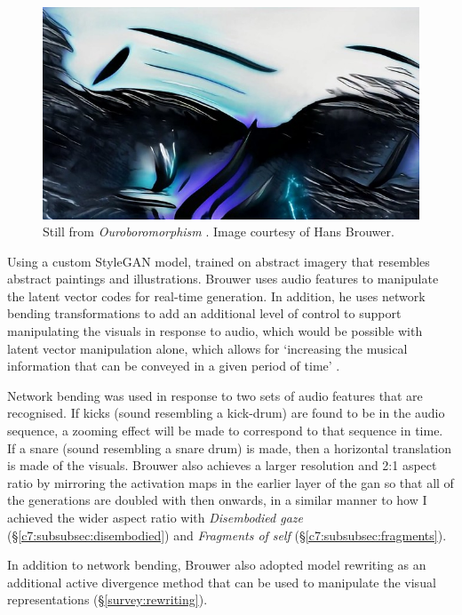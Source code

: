 \begin{figure}[!htb]
    \centering
    \captionsetup{justification=centering}
    \includegraphics[width=1\textwidth]{figures/c7_impact/other-artworks/Ouroboromorphism.png}
    \caption[Still from \textit{Ouroboromorphism}]{Still from \textit{Ouroboromorphism} \citep{brouwer2020ourobo}. Image courtesy of Hans Brouwer.}
    \label{fig:c7:ouroboromorphism}
\end{figure}


Using a custom StyleGAN model, trained on abstract imagery that resembles abstract paintings and illustrations.
 Brouwer uses audio features to manipulate the latent vector codes for real-time generation. 
 In addition, he uses network bending transformations to add an additional level of control to support manipulating the visuals in response to audio, which would be possible with latent vector manipulation alone, which allows for `increasing the musical information that can be conveyed in a given period of time' \citep{brouwer2020audio}. 

Network bending was used in response to two sets of audio features that are recognised.
If kicks (sound resembling a kick-drum) are found to be in the audio sequence, a zooming effect will be made to correspond to that sequence in time. If a snare (sound resembling a snare drum) is made, then a horizontal translation is made of the visuals. 
Brouwer also achieves a larger resolution and 2:1 aspect ratio by mirroring the activation maps in the earlier layer of the gan so that all of the generations are doubled with then onwards, in a similar manner to how I achieved the wider aspect ratio with \textit{Disembodied gaze} (\S \ref{c7:subsubsec:disembodied}) and \textit{Fragments of self} (\S \ref{c7:subsubsec:fragments}). 

In addition to network bending, Brouwer also adopted model rewriting \citep{bau2020rewriting} as an additional active divergence method that can be used to manipulate the visual representations (\S \ref{survey:rewriting}).

